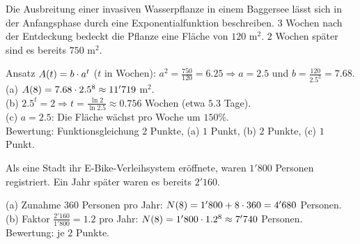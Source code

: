\documentclass[11pt]{exam}
\begin{document}
\begin{questions}
\newpage
\question[6]
Die Ausbreitung einer invasiven Wasserpflanze in einem Baggersee lässt sich in der Anfangsphase durch eine Exponentialfunktion beschreiben. $3$ Wochen nach der Entdeckung bedeckt die Pflanze eine Fläche von $120$ m$^2$. $2$ Wochen später sind es bereits $750$ m$^2$.
{\begin{solution}
		Ansatz $A(t)=b\cdot a^t$ ($t$ in Wochen): $a^2=\frac{750}{120}=6.25\Rightarrow a=2.5$ und $b=\frac{120}{2.5^3}=7.68$.\\
		(a) $A(8)=7.68\cdot2.5^8\approx 11'719$ m$^2$.\\
		(b) $2.5^t=2\Rightarrow t=\frac{\ln{2}}{\ln{2.5}}\approx 0.756$ Wochen (etwa $5.3$ Tage).\\
		(c) $a=2.5$: Die Fläche wächst pro Woche um $150\%$.\\
		Bewertung: Funktionsgleichung $2$ Punkte, (a) $1$ Punkt, (b) $2$ Punkte, (c) $1$ Punkt.
\end{solution}}
{\vfill}


\newpage
\question[4]
Als eine Stadt ihr E-Bike-Verleihsystem eröffnete, waren $1'800$ Personen registriert. Ein Jahr später waren es bereits $2'160$.
{\begin{solution}
		(a) Zunahme $360$ Personen pro Jahr: $N(8)=1'800+8\cdot360=4'680$ Personen.\\
		(b) Faktor $\frac{2'160}{1'800}=1.2$ pro Jahr: $N(8)=1'800\cdot1.2^8\approx 7'740$ Personen.\\
		Bewertung: je $2$ Punkte.
\end{solution}}
{\vfill}


\end{questions}
\end{document}
